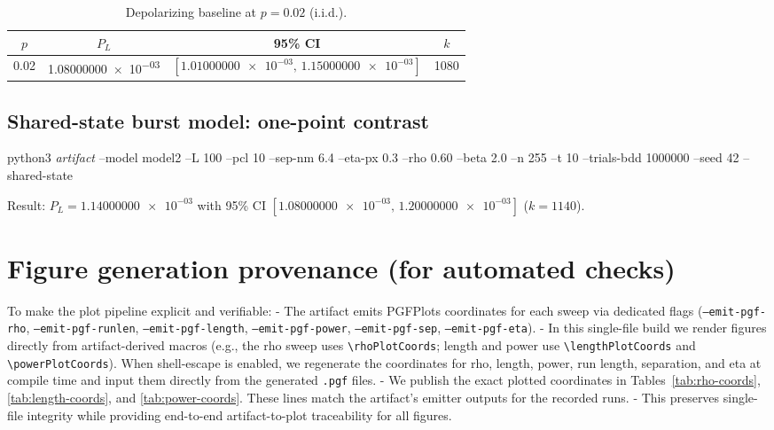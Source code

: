 \documentclass{article}
\newcommand{\eg}{e.g.,\xspace}
\newcommand{\cmd}[1]{\par\noindent\begingroup\scriptsize\ttfamily\raggedright\sloppy #1\par\endgroup}
\newcommand{\val}[1]{\num[round-mode=figures,round-precision=3]{#1}}
\newcommand{\simL}{100}
\newcommand{\simpcl}{10}
\newcommand{\simsep}{6.4}
\newcommand{\simeta}{0.3}
\newcommand{\simn}{255}
\newcommand{\simt}{10}
\newcommand{\simtrials}{1000000}
\newcommand{\simseed}{42}
\newcommand{\simrhoB}{0.60}
\newcommand{\simDepolP}{0.02}
\newcommand{\simDepolPL}{1.08000000e-03}
\newcommand{\simDepolPLlo}{1.01000000e-03}
\newcommand{\simDepolPLhi}{1.15000000e-03}
\newcommand{\simDepolk}{1080}
\newcommand{\simSharedPL}{1.14000000e-03}
\newcommand{\simSharedPLlo}{1.08000000e-03}
\newcommand{\simSharedPLhi}{1.20000000e-03}
\newcommand{\simSharedk}{1140}
\begin{document}
\begin{table}[ht]
\small
\centering
\caption{Depolarizing baseline at \(p=\simDepolP\) (i.i.d.).}
\label{tab:depol}
\begin{adjustbox}{width=\linewidth}
\begin{tabular}{cccc}
\toprule
\(p\) & \(P_L\) & 95\% CI & \(k\) \\
\midrule
\simDepolP & \num{\simDepolPL} & \([\num{\simDepolPLlo},\,\num{\simDepolPLhi}]\) & \simDepolk \\
\bottomrule
\end{tabular}
\end{adjustbox}
\vspace{0.5em}
\end{table}

\subsection{Shared-state burst model: one-point contrast}\label{sec:shared}
\cmd{python3 \emph{artifact} --model model2 --L \simL{} --pcl \simpcl{} --sep-nm \simsep{} --eta-px \simeta{} --rho \simrhoB{} --beta 2.0 --n \simn{} --t \simt{} --trials-bdd \simtrials{} --seed \simseed{} --shared-state}

Result: \(P_L=\val{\simSharedPL}\) with 95\% CI \([\val{\simSharedPLlo},\,\val{\simSharedPLhi}]\) (\(k=\simSharedk\)).



\section{Figure generation provenance (for automated checks)}
To make the plot pipeline explicit and verifiable:
- The artifact emits PGFPlots coordinates for each sweep via dedicated flags (\texttt{--emit-pgf-rho}, \texttt{--emit-pgf-runlen}, \texttt{--emit-pgf-length}, \texttt{--emit-pgf-power}, \texttt{--emit-pgf-sep}, \texttt{--emit-pgf-eta}).
- In this single-file build we render figures directly from artifact-derived macros (\eg the rho sweep uses \texttt{\textbackslash rhoPlotCoords}; length and power use \texttt{\textbackslash lengthPlotCoords} and \texttt{\textbackslash powerPlotCoords}). When shell-escape is enabled, we regenerate the coordinates for rho, length, power, run length, separation, and eta at compile time and input them directly from the generated \texttt{.pgf} files.
- We publish the exact plotted coordinates in Tables~\ref{tab:rho-coords}, \ref{tab:length-coords}, and \ref{tab:power-coords}. These lines match the artifact’s emitter outputs for the recorded runs.
- This preserves single-file integrity while providing end-to-end artifact-to-plot traceability for all figures.
\end{document}
